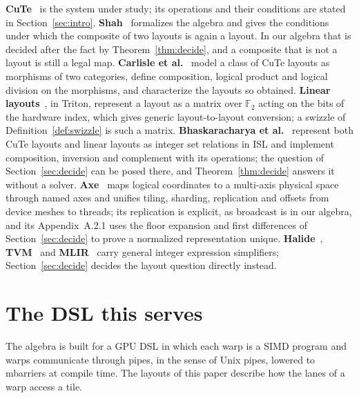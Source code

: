 \documentclass[11pt]{article}
\theoremstyle{definition}
\newcommand{\broadcast}{\mathrm{broadcast}}
\begin{document}
\textbf{CuTe}~\cite{cutedocs,cecka} is the system under study; its operations
and their conditions are stated in Section~\ref{sec:intro}.
\textbf{Shah}~\cite{shah} formalizes the algebra and gives the conditions
under which the composite of two layouts is again a layout. In our algebra
that is decided after the fact by Theorem~\ref{thm:decide}, and a composite
that is not a layout is still a legal map. \textbf{Carlisle et
al.}~\cite{categorical} model a class of CuTe layouts as morphisms of two
categories, define composition, logical product and logical division on the
morphisms, and characterize the layouts so obtained. \textbf{Linear
layouts}~\cite{triton}, in Triton, represent a layout as a matrix over
$\mathbb{F}_2$ acting on the bits of the hardware index, which gives generic
layout-to-layout conversion; a swizzle of Definition~\ref{def:swizzle} is such
a matrix. \textbf{Bhaskaracharya et al.}~\cite{isl} represent both CuTe
layouts and linear layouts as integer set relations in ISL and implement
composition, inversion and complement with its operations; the question of
Section~\ref{sec:decide} can be posed there, and Theorem~\ref{thm:decide}
answers it without a solver. \textbf{Axe}~\cite{axe} maps logical
coordinates to a multi-axis physical space through named axes and unifies
tiling, sharding, replication and offsets from device meshes to threads; its
replication is explicit, as $\broadcast$ is in our algebra, and its
Appendix~A.2.1 uses the floor expansion and first differences of
Section~\ref{sec:decide} to prove a normalized representation unique.
\textbf{Halide}~\cite{halide}, \textbf{TVM}~\cite{tvm} and
\textbf{MLIR}~\cite{mlir} carry general integer expression simplifiers;
Section~\ref{sec:decide} decides the layout question directly instead.

\section{The DSL this serves}\label{sec:coda}

The algebra is built for a GPU DSL in which each warp is a SIMD program
and warps communicate through pipes, in the sense of Unix pipes, lowered to
mbarriers at compile time. The layouts of this paper describe how the lanes of
a warp access a tile.
\end{document}
